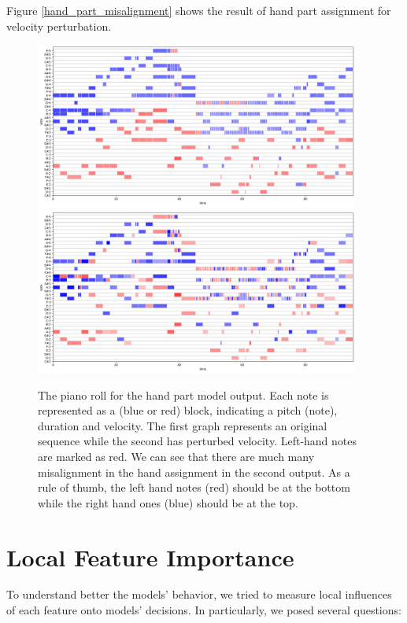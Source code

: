 Figure \ref{hand_part_misalignment} shows the result of hand part assignment for velocity perturbation.

\begin{figure}[!ht]
\centering
\includegraphics[width=0.95\textwidth]{images/hand_part1.png}
\includegraphics[width=0.95\textwidth]{images/hand_part2.png}
\caption[The piano roll for the hand part model output]{The piano roll for the hand part model output. Each note is represented as a (blue or red) block, indicating a pitch (note), duration and velocity. The first graph represents an original sequence while the second has perturbed velocity. Left-hand notes are marked as red. We can see that there are much many misalignment in the hand assignment in the second output. As a rule of thumb, the left hand notes (red) should be at the bottom while the right hand ones (blue) should be at the top.}\end{figure}

\section{Local Feature Importance}

To understand better the models' behavior, we tried to measure local influences of each feature onto models' decisions. In particularly, we posed several questions:

